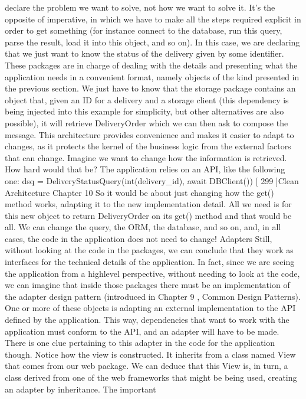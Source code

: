 \documentclass[a4paper,10pt,english]{sphinxmanual}
\begin{document}
declare the problem we want to solve, not how we want to solve it. It’s the opposite
of imperative, in which we have to make all the steps required explicit in order to get
something (for instance connect to the database, run this query, parse the result, load it into
this object, and so on). In this case, we are declaring that we just want to know the status of
the delivery given by some identifier.
These packages are in charge of dealing with the details and presenting what the
application needs in a convenient format, namely objects of the kind presented in the
previous section. We just have to know that the storage package contains an object that,
given an ID for a delivery and a storage client (this dependency is being injected into this
example for simplicity, but other alternatives are also possible), it will
retrieve DeliveryOrder which we can then ask to compose the message.
This architecture provides convenience and makes it easier to adapt to changes, as it
protects the kernel of the business logic from the external factors that can change.
Imagine we want to change how the information is retrieved. How hard would that be? The
application relies on an API, like the following one:
dsq = DeliveryStatusQuery(int(delivery\_id), await DBClient())
{[} 299 {]}Clean Architecture
Chapter 10
So it would be about just changing how the get() method works, adapting it to the new
implementation detail. All we need is for this new object to return DeliveryOrder on
its get() method and that would be all. We can change the query, the ORM, the database,
and so on, and, in all cases, the code in the application does not need to change!
Adapters
Still, without looking at the code in the packages, we can conclude that they work as
interfaces for the technical details of the application.
In fact, since we are seeing the application from a high\sphinxhyphen{}level perspective, without needing
to look at the code, we can imagine that inside those packages there must be an
implementation of the adapter design pattern (introduced in Chapter 9 , Common Design
Patterns). One or more of these objects is adapting an external implementation to the API
defined by the application. This way, dependencies that want to work with the application
must conform to the API, and an adapter will have to be made.
There is one clue pertaining to this adapter in the code for the application though. Notice
how the view is constructed. It inherits from a class named View that comes from our web
package. We can deduce that this View is, in turn, a class derived from one of the web
frameworks that might be being used, creating an adapter by inheritance. The important
\end{document}
